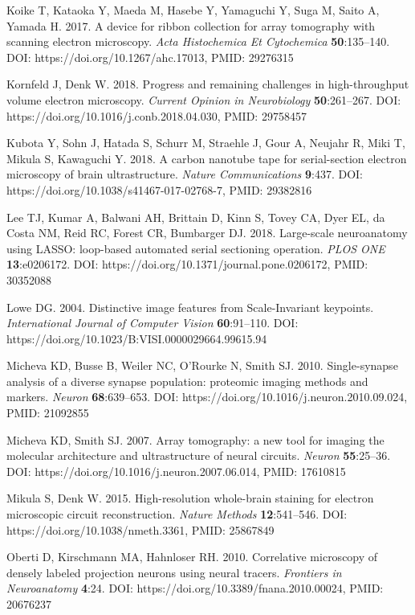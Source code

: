\documentclass{article}
\newenvironment{reflist}{\par\small\setlength{\parindent}{0pt}\everypar{\hangindent=2.2em\hangafter=1}}{\par}
\begin{document}
\begin{reflist}
Koike T, Kataoka Y, Maeda M, Hasebe Y, Yamaguchi Y, Suga M, Saito A, Yamada H. 2017. A device for ribbon collection for array tomography with scanning electron microscopy. \emph{Acta Histochemica Et Cytochemica} \textbf{50}:135–140. DOI: https://doi.org/10.1267/ahc.17013, PMID: 29276315

Kornfeld J, Denk W. 2018. Progress and remaining challenges in high-throughput volume electron microscopy. \emph{Current Opinion in Neurobiology} \textbf{50}:261–267. DOI: https://doi.org/10.1016/j.conb.2018.04.030, PMID: 29758457

Kubota Y, Sohn J, Hatada S, Schurr M, Straehle J, Gour A, Neujahr R, Miki T, Mikula S, Kawaguchi Y. 2018. A carbon nanotube tape for serial-section electron microscopy of brain ultrastructure. \emph{Nature Communications} \textbf{9}:437. DOI: https://doi.org/10.1038/s41467-017-02768-7, PMID: 29382816

Lee TJ, Kumar A, Balwani AH, Brittain D, Kinn S, Tovey CA, Dyer EL, da Costa NM, Reid RC, Forest CR, Bumbarger DJ. 2018. Large-scale neuroanatomy using LASSO: loop-based automated serial sectioning operation. \emph{PLOS ONE} \textbf{13}:e0206172. DOI: https://doi.org/10.1371/journal.pone.0206172, PMID: 30352088

Lowe DG. 2004. Distinctive image features from Scale-Invariant keypoints. \emph{International Journal of Computer Vision} \textbf{60}:91–110. DOI: https://doi.org/10.1023/B:VISI.0000029664.99615.94

Micheva KD, Busse B, Weiler NC, O’Rourke N, Smith SJ. 2010. Single-synapse analysis of a diverse synapse population: proteomic imaging methods and markers. \emph{Neuron} \textbf{68}:639–653. DOI: https://doi.org/10.1016/j.neuron.2010.09.024, PMID: 21092855

Micheva KD, Smith SJ. 2007. Array tomography: a new tool for imaging the molecular architecture and ultrastructure of neural circuits. \emph{Neuron} \textbf{55}:25–36. DOI: https://doi.org/10.1016/j.neuron.2007.06.014, PMID: 17610815

Mikula S, Denk W. 2015. High-resolution whole-brain staining for electron microscopic circuit reconstruction. \emph{Nature Methods} \textbf{12}:541–546. DOI: https://doi.org/10.1038/nmeth.3361, PMID: 25867849

Oberti D, Kirschmann MA, Hahnloser RH. 2010. Correlative microscopy of densely labeled projection neurons using neural tracers. \emph{Frontiers in Neuroanatomy} \textbf{4}:24. DOI: https://doi.org/10.3389/fnana.2010.00024, PMID: 20676237


\end{reflist}
\end{document}
